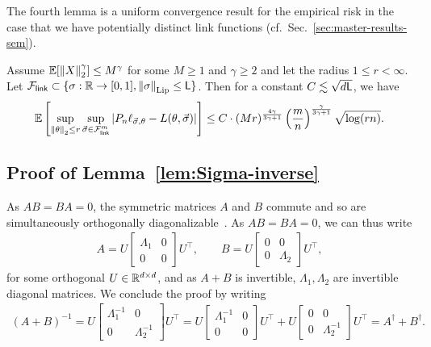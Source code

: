 The fourth lemma is a uniform convergence result for the empirical risk in
the case that we have potentially distinct link functions
(cf.~Sec.~\ref{sec:master-results-sem}).
\begin{lemma}
  \label{lemma:rademacher-symmetrization}
  Assume $\mathbb{E}[\left\|{X}\right\|_2^{\gamma}] \le M^\gamma$ for some $M \ge 1$ and $\gamma
  \ge 2$ and let the radius $1 \le r < \infty$. Let $\mathcal{F}_{\mathsf{link}} \subset \{\sigma
  : \mathbb{R} \to [0, 1], \left\|{\sigma}\right\|_{\textup{Lip}} \le \mathsf{L}\}$.  Then for a constant
  $C \lesssim \sqrt{d \mathsf{L}}$, we have
  \begin{equation*}
    \mathbb{E}\left[\sup_{\left\|{\theta}\right\|_2 \le r}
      \sup_{\vec{\sigma} \in \mathcal{F}_{\mathsf{link}}^m} |P_n \ell_{\vec{\sigma},\theta} - L(\theta,
      \vec{\sigma})|\right]
    \le C \cdot
    (M r)^\frac{4\gamma}{3\gamma + 1} 
    \left(\frac{m}{n}\right)^\frac{\gamma}{3\gamma + 1}
    \sqrt{\log(rn)}.
  \end{equation*}
\end{lemma}


\subsection{Proof of Lemma~\ref{lem:Sigma-inverse}}
\label{proof:Sigma-inverse}

As $AB=BA=0$, the symmetric matrices $A$ and $B$ commute and so are
simultaneously orthogonally diagonalizable~\cite[Thm.~4.5.15]{HornJo85}. As
$AB=BA=0$, we can thus write
\begin{align*}
	A = U \begin{bmatrix} \Lambda_1 & 0 \\ 0 & 0 \end{bmatrix} U^\top  , \qquad B = U \begin{bmatrix} 0 & 0 \\ 0 & \Lambda_2 \end{bmatrix} U^\top  ,
\end{align*}
for some orthogonal $U \in \mathbb{R}^{d \times d}$, and as $A+B$ is invertible,  $\Lambda_1, \Lambda_2$ are invertible diagonal matrices. We conclude the proof by writing
\begin{align*}
	(A+ B)^{-1} = U \begin{bmatrix} \Lambda_1^{-1} & 0 \\ 0 & \Lambda_2^{-1} \end{bmatrix} U^\top = U \begin{bmatrix} \Lambda_1^{-1} & 0 \\ 0 & 0 \end{bmatrix} U^\top + U \begin{bmatrix} 0 & 0 \\ 0 & \Lambda_2^{-1} \end{bmatrix} U^\top = A^\dagger + B^\dagger .
\end{align*}

